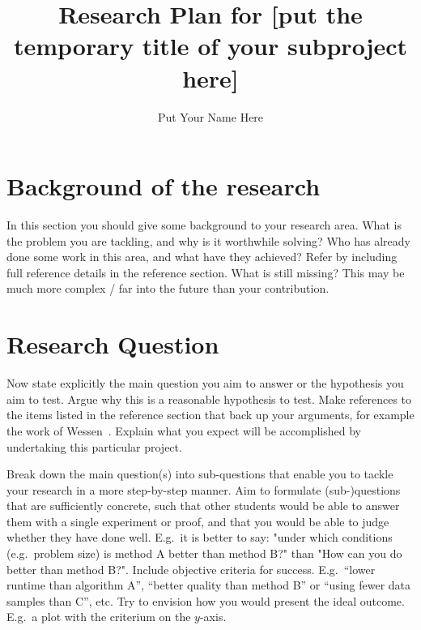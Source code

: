 \documentclass[english]{article}
\title{Research Plan for [put the temporary title of your subproject here]}
\author{Put Your Name Here}
\newcommand{\namelistlabel}[1]{\mbox{#1}\hfil}
\newenvironment{namelist}[1]{%
\begin{list}{}
    {
        \let\makelabel\namelistlabel
        \settowidth{\labelwidth}{#1}
        \setlength{\leftmargin}{1.1\labelwidth}
    }
  }{%
\end{list}}
\begin{document}
\maketitle



\section*{Background of the research}
In this section you should give some background to your
research area. What is the problem you are tackling, and why is it
worthwhile solving? Who has already done some work in this area,
and what have they achieved? Refer by including full reference details in the reference section.
What is still missing? This may be much more complex / far into the future than your contribution.


\section*{Research Question}
Now state explicitly the main question you aim to answer or the hypothesis you aim to
test. 
Argue why this is a reasonable hypothesis to test.
Make references to the items listed in the reference section
that back up your arguments, for example the work of Wessen~\cite{wessen}.
Explain what you expect will be accomplished by undertaking this
particular project.  

Break down the main question(s) into sub-questions that enable you to tackle your research in a more step-by-step manner.
Aim to formulate (sub-)questions that are sufficiently concrete, such that other students would be able to answer them with a single experiment or proof, and that you would be able to judge whether they have done well. E.g.\ it is better to say: "under which conditions (e.g.\ problem size) is method A better than method B?" than "How can you do better than method B?". Include objective criteria for success. E.g.\ ``lower runtime than algorithm A'', ``better quality than method B'' or ``using fewer data samples than C'', etc. Try to envision how you would present the ideal outcome. E.g.\ a plot with the criterium on the $y$-axis.
\end{document}
